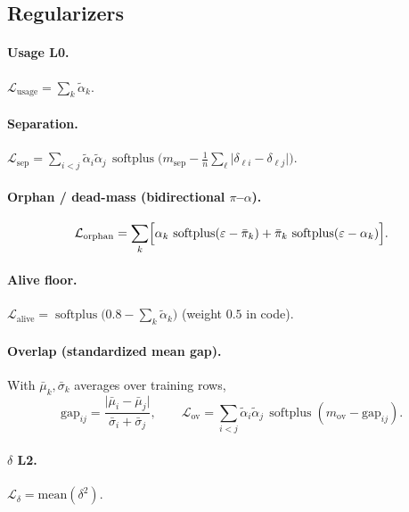 \documentclass[11pt,a4paper]{article}
\newcommand{\softplus}{\operatorname{softplus}}
\begin{document}
\subsection{Regularizers}
\paragraph{Usage L0.}
\(
  \mathcal{L}_{\mathrm{usage}}
  =
  \sum_k \tilde\alpha_k.
\)

\paragraph{Separation.}
\(
  \mathcal{L}_{\mathrm{sep}}
  =
  \sum_{i<j}
  \tilde\alpha_i\tilde\alpha_j\,
  \softplus\!\bigl(m_{\mathrm{sep}}-\tfrac{1}{n}\sum_\ell\lvert\delta_{\ell i}-\delta_{\ell j}\rvert\bigr).
\)

\paragraph{Orphan / dead-mass (bidirectional \(\pi\)--\(\alpha\)).}
\begin{equation}
  \mathcal{L}_{\mathrm{orphan}}
  =
  \sum_k
  \Bigl[
    \alpha_k\,\softplus(\varepsilon-\bar\pi_k)
    +
    \bar\pi_k\,\softplus(\varepsilon-\alpha_k)
  \Bigr].
\end{equation}

\paragraph{Alive floor.}
\(
  \mathcal{L}_{\mathrm{alive}}
  =
  \softplus\!\bigl(0.8-\sum_k\tilde\alpha_k\bigr)
\)
(weight \(0.5\) in code).

\paragraph{Overlap (standardized mean gap).}
With \(\bar\mu_k,\bar\sigma_k\) averages over training rows,
\begin{equation}
  \mathrm{gap}_{ij}
  =
  \frac{\lvert\bar\mu_i-\bar\mu_j\rvert}{\bar\sigma_i+\bar\sigma_j},
  \qquad
  \mathcal{L}_{\mathrm{ov}}
  =
  \sum_{i<j}
  \tilde\alpha_i\tilde\alpha_j\,
  \softplus(m_{\mathrm{ov}}-\mathrm{gap}_{ij}).
\end{equation}

\paragraph{\(\delta\) L2.}
\(\mathcal{L}_{\delta}=\mathrm{mean}(\delta^2)\).
\end{document}
